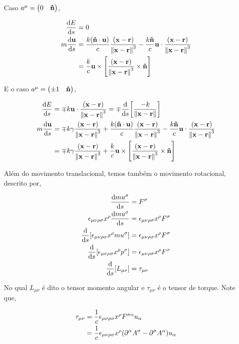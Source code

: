 \documentclass[twoside]{amsart}
\numberwithin{equation}{section}
\begin{document}
Caso $a^\mu =\mqty(0&\vb{\hat n})$,

\begin{align}
    \dv{E}{s}&=0\\
    m\dv{\vb u}{s}&=\frac{k\qty(\vb {\hat n}\cdot \vb u)}{c}\frac{\qty(\vb x-\vb r)}{\norm{\vb x-\vb r}^{3}}-\frac{k\vb {\hat n}}{c}\vb u \cdot \frac{\qty(\vb x-\vb r)}{\norm{\vb x-\vb r}^{3}}\\
    &=\frac kc\vb u\times\qty[\frac{\qty(\vb x-\vb r)}{\norm{\vb x-\vb r}^3}\times \vb {\hat n}]
\end{align}

E o caso $a^\mu=\mqty(\pm 1&\vb {\hat n})$,

\begin{align}
    \dv{E}{s}&=\mp k\vb u\cdot\frac{\qty(\vb x-\vb r)}{\norm{\vb x-\vb r}^3}=\mp \dv{}{s}\qty[\frac{-k}{\norm{\vb x-\vb r}}]\\
    m\dv{\vb u}{s}&=\mp k \gamma\frac{\qty(\vb x-\vb r)}{\norm{\vb x-\vb r}^{3}}+\frac{k\qty(\vb {\hat n}\cdot \vb u)}{c}\frac{\qty(\vb x-\vb r)}{\norm{\vb x-\vb r}^{3}}-\frac{k\vb {\hat n}}{c}\vb u \cdot \frac{\qty(\vb x-\vb r)}{\norm{\vb x-\vb r}^{3}}\\
    &=\mp k \gamma\frac{\qty(\vb x-\vb r)}{\norm{\vb x-\vb r}^{3}}+\frac kc\vb u\times\qty[\frac{\qty(\vb x-\vb r)}{\norm{\vb x-\vb r}^3}\times \vb {\hat n}]
\end{align}

Além do movimento translacional, temos também o movimento rotacional, descrito por,

\begin{align}
    \dv{mu^\sigma}{s}&=F^\sigma\\
    \epsilon_{\mu\nu\rho\sigma}x^\rho\dv{mu^\sigma}{s}&=\epsilon_{\mu\nu\rho\sigma}x^\rho F^\sigma\\
    \dv{}{s}\qty[\epsilon_{\mu\nu\rho\sigma}x^\rho mu^\sigma]&=\epsilon_{\mu\nu\rho\sigma}x^\rho F^\sigma\\
    \dv{}{s}\qty[\epsilon_{\mu\nu\rho\sigma}x^\rho p^\sigma]&=\epsilon_{\mu\nu\rho\sigma}x^\rho F^\sigma\\
    \dv{}{s}\qty[L_{\mu\nu}]&=\tau_{\mu\nu}
\end{align}

No qual $L_{\mu\nu}$ é dito o tensor momento angular e $\tau_{\mu\nu}$ é o tensor de torque. Note que,

\begin{align}
    \tau_{\mu\nu}&=\frac1c\epsilon_{\mu\nu\rho\sigma}x^\rho F^{\sigma\alpha}u_\alpha\\
    &=\frac1c\epsilon_{\mu\nu\rho\sigma}x^\rho\qty(\partial^\alpha A^\sigma-\partial^\sigma A^\alpha)u_\alpha
\end{align}
\end{document}
